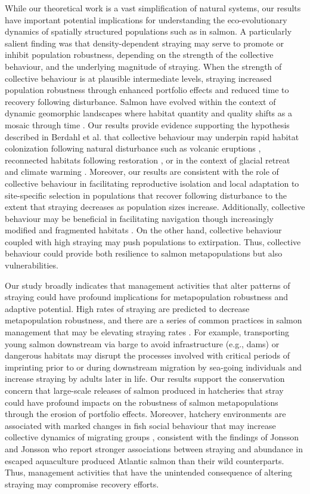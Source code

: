 \documentclass{revtex4}
\begin{document}
While our theoretical work is a vast simplification of natural systems, our results have important potential implications for understanding the eco-evolutionary dynamics of spatially structured populations such as in salmon. 
A particularly salient finding was that density-dependent straying may serve to promote or inhibit population robustness, depending on the strength of the collective behaviour, and the underlying magnitude of straying.
When the strength of collective behaviour is at plausible intermediate levels, straying increased population robustness through enhanced portfolio effects and reduced time to recovery following disturbance. 
Salmon have evolved within the context of dynamic geomorphic landscapes where habitat quantity and quality shifts as a mosaic through time \citep{Stanford:2017bu}. 
Our results provide evidence supporting the hypothesis described in Berdahl et al. \citep{Berdahl:2014bl} that collective behaviour may underpin rapid habitat colonization following natural disturbance such as volcanic eruptions \citep{Leider:1989gx}, reconnected habitats following restoration \citep{Pess:2012by,Pess:2014isa}, or in the context of glacial retreat and climate warming \citep{Milner:2008gb}. 
Moreover, our results are consistent with the role of collective behaviour in facilitating reproductive isolation and local adaptation to site-specific selection in populations that recover following disturbance to the extent that straying decreases as population sizes increase. 
Additionally, collective behaviour may be beneficial in facilitating navigation though increasingly modified and fragmented habitats \citep{Berdahl:2017uu}. 
On the other hand, collective behaviour coupled with high straying may push populations to extirpation. 
Thus, collective behaviour could provide both resilience to salmon metapopulations but also vulnerabilities.  

Our study broadly indicates that management activities that alter patterns of straying could have profound implications for metapopulation robustness and adaptive potential. 
High rates of straying are predicted to decrease metapopulation robustness, and there are a series of common practices in salmon management that may be elevating straying rates \citep{Ford:2002ip,Brenner:2012gl}.
For example, transporting young salmon downstream via barge to avoid infrastructure (e.g., dams) or dangerous habitats may disrupt the processes involved with critical periods of imprinting prior to or during downstream migration by sea-going individuals and increase straying by adults later in life. 
Our results support the conservation concern that large-scale releases of salmon produced in hatcheries that stray could have profound impacts on the robustness of salmon metapopulations through the erosion of portfolio effects. 
Moreover, hatchery environments are associated with marked changes in fish social behaviour that may increase collective dynamics of migrating groups \citep{Ruzzante:1994bu}, consistent with the findings of Jonsson and Jonsson \citep{Jonsson:2011kg} who report stronger associations between straying and abundance in escaped aquaculture produced Atlantic salmon than their wild counterparts. 
Thus, management activities that have the unintended consequence of altering straying may compromise recovery efforts.
\end{document}
